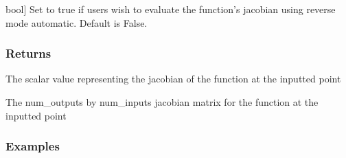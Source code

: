 \documentclass[letterpaper,10pt,english]{sphinxmanual}
\begin{document}
\begin{fulllineitems}
\begin{fulllineitems}
\begin{description}
\sphinxlineitem{reverse}{[}bool{]}
\sphinxAtStartPar
Set to true if users wish to evaluate the function’s jacobian using reverse mode automatic.  Default is False.

\end{description}


\subsubsection{Returns}
\label{\detokenize{autodiff:id5}}\begin{description}
\begin{description}
\sphinxAtStartPar
The scalar value representing the jacobian of the function at the inputted point

\end{description}

\begin{description}
\sphinxAtStartPar
The num\_outputs by num\_inputs jacobian matrix for the function at the inputted point

\end{description}

\end{description}


\subsubsection{Examples}
\label{\detokenize{autodiff:id6}}
\begin{sphinxVerbatim}[commandchars=\\\{\}]
         
    
  \PYG{p}{[}\PYG{p}{]}
 
  
  \PYG{p}{[}\PYG{p}{]}
\PYG{g+go}{array([[12.,  4.],}
\PYG{g+go}{      [ 1., \PYGZhy{}1.]])}
\end{sphinxVerbatim}

\end{fulllineitems}


\end{fulllineitems}
\end{document}
